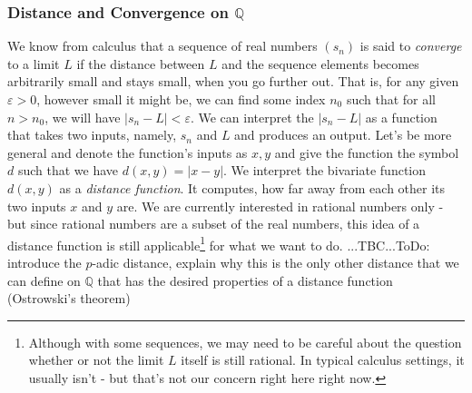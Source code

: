 %







\subsubsection{Distance and Convergence on $\mathbb{Q}$}
We know from calculus that a sequence of real numbers $(s_n)$ is said to \emph{converge} to a limit $L$ if the distance between $L$ and the sequence elements becomes arbitrarily small and stays small, when you go further out. That is, for any given $\varepsilon > 0$, however small it might be, we can find some index $n_0$ such that for all $n > n_0$, we will have $|s_n - L| < \varepsilon$. We can interpret the $|s_n - L|$ as a function that takes two inputs, namely, $s_n$ and $L$ and produces an output. Let's be more general and denote the function's inputs as $x,y$ and give the function the symbol $d$ such that we have $d(x,y) = |x-y|$. We interpret the bivariate function $d(x,y)$ as a \emph{distance function}. It computes, how far away from each other its two inputs $x$ and $y$ are. We are currently interested in rational numbers only - but since rational numbers are a subset of the real numbers, this idea of a distance function is still applicable\footnote{Although with some sequences, we may need to be careful about the question whether or not the limit $L$ itself is still rational. In typical calculus settings, it usually isn't - but that's not our concern right here right now.} for what we want to do. ...TBC...ToDo: introduce the $p$-adic distance, explain why this is the only other distance that we can define on $\mathbb{Q}$ that has the desired properties of a distance function (Ostrowski's theorem)


